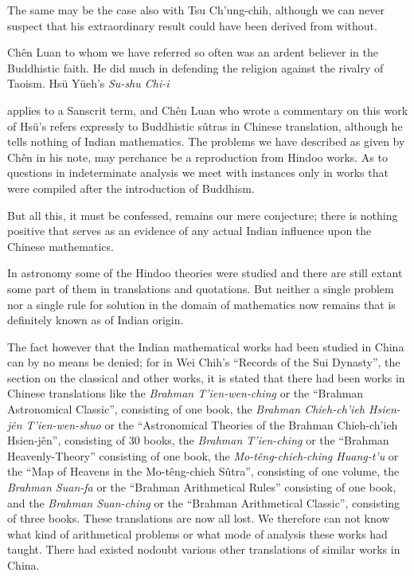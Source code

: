\documentclass[11pt]{article}
\newcommand{\scanpage}[2]{\clearpage\setcounter{footnote}{0}\noindent{\footnotesize\color{gray}PDF page #1 · #2}\par\medskip}
\newcommand{\scanfooter}{}
\begin{document}
The same may be the case also with Tsu Ch'ung-chih, although we can never suspect that his extraordinary result could have been derived from without.

Chên Luan to whom we have referred so often was an ardent believer in the Buddhistic faith. He did much in defending the religion against the rivalry of Taoism. Hsü Yüeh's \emph{Su-shu Chi-i}
\scanfooter

\scanpage{0072}{Chapter 9, printed page 58}
applies to a Sanscrit term, and Chên Luan who wrote a commentary on this work of Hsü's refers expressly to Buddhistic sûtras in Chinese translation, although he tells nothing of Indian mathematics. The problems we have described as given by Chên in his note, may perchance be a reproduction from Hindoo works. As to questions in indeterminate analysis we meet with instances only in works that were compiled after the introduction of Buddhism.

But all this, it must be confessed, remains our mere conjecture; there is nothing positive that serves as an evidence of any actual Indian influence upon the Chinese mathematics.

In astronomy some of the Hindoo theories were studied and there are still extant some part of them in translations and quotations. But neither a single problem nor a single rule for solution in the domain of mathematics now remains that is definitely known as of Indian origin.

The fact however that the Indian mathematical works had been studied in China can by no means be denied; for in Wei Chih's ``Records of the Sui Dynasty'', the section on the classical and other works, it is stated that there had been works in Chinese translations like the \emph{Brahman T'ien-wen-ching} or the ``Brahman Astronomical Classic'', consisting of one book, the \emph{Brahman Chieh-ch'ieh Hsien-jên T'ien-wen-shuo} or the ``Astronomical Theories of the Brahman Chieh-ch'ieh Hsien-jên'', consisting of 30 books, the \emph{Brahman T'ien-ching} or the ``Brahman Heavenly-Theory'' consisting of one book, the \emph{Mo-têng-chieh-ching Huang-t'u} or the ``Map of Heavens in the Mo-têng-chieh Sûtra'', consisting of one volume, the \emph{Brahman Suan-fa} or the ``Brahman Arithmetical Rules'' consisting of one book, and the \emph{Brahman Suan-ching} or the ``Brahman Arithmetical Classic'', consisting of three books. These translations are now all lost. We therefore can not know what kind of arithmetical problems or what mode of analysis these works had taught. There had existed nodoubt various other translations of similar works in China.
\end{document}
